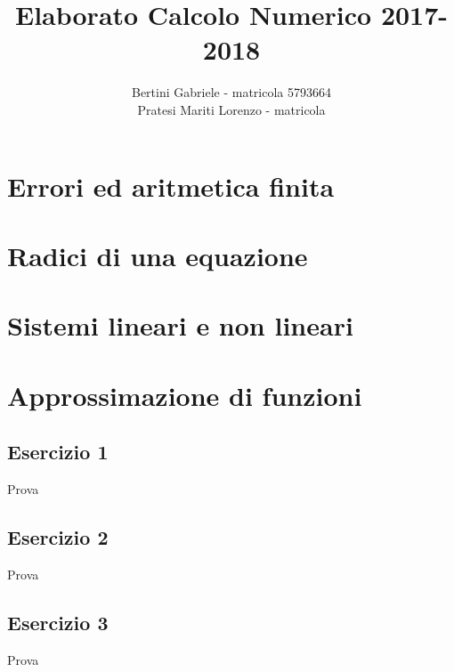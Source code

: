 \documentclass[10pt,a4paper]{report}
\begin{document}
	\author{Bertini Gabriele - matricola 5793664\\Pratesi Mariti Lorenzo - matricola }
	\title{Elaborato Calcolo Numerico 2017-2018}
	\maketitle
	\tableofcontents
	\chapter{Errori ed aritmetica finita}
	
	\chapter{Radici di una equazione}
	
	\chapter{Sistemi lineari e non lineari}
	
	\chapter{Approssimazione di funzioni}
		\section{Esercizio 1}
			Prova
			
		\section{Esercizio 2}
			Prova
			
		\section{Esercizio 3}
			Prova
					
\end{document}
